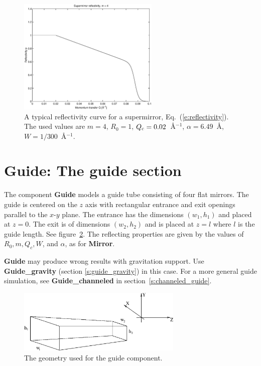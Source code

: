 \begin{figure}
  \begin{center}
    \includegraphics[width=0.6\textwidth]{figures/supermirror.eps}
  \end{center}
\caption{A typical reflectivity curve for a supermirror,
Eq.~(\protect\ref{e:reflectivity}). The used values are
$ m=4$, $R_0=1$, $Q_{\rm c} = 0.02$~\AA$^{-1}$, $\alpha = 6.49$~\AA,
$ W=1/300$~\AA$^{-1}$.
}
\label{f:reflectivity}
\end{figure}

\newpage

\section{Guide: The guide section}


The component {\bf Guide}
models a guide tube consisting of four flat mirrors. The
guide is centered on the $z$ axis with rectangular entrance and exit
openings parallel to the $x$-$y$ plane. The entrance has the dimensions
$(w_1,h_1)$ and placed at $z=0$. The exit is of dimensions $(w_2,h_2)$
and is placed at $z=l$ where $l$ is the guide length. See
figure~\ref{f:guide}.
The reflecting properties are given by the values of
$R_0, m, Q_c, W$, and $\alpha$, as for {\bf Mirror}.

{\bf Guide} may produce wrong results with gravitation support.
Use {\bf Guide\_gravity} (section \ref{s:guide_gravity}) in this case.
For a more general guide simulation, see {\bf Guide\_channeled}
in section~\ref{s:channeled_guide}.

\begin{figure}
  \begin{center}
    \includegraphics[width=0.7\textwidth]{figures/guide1.eps}
  \end{center}
\caption{The geometry used for the guide component.}
\label{f:guide}
\end{figure}

